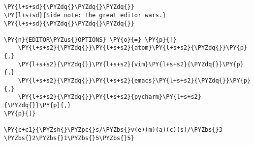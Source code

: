 

\section*{}

\begin{Verbatim}[commandchars=\\\{\}]
\PY{l+s+sd}{\PYZdq{}\PYZdq{}\PYZdq{}}
\PY{l+s+sd}{Side note: The great editor wars.}
\PY{l+s+sd}{\PYZdq{}\PYZdq{}\PYZdq{}}

\PY{n}{EDITOR\PYZus{}OPTIONS} \PY{o}{=} \PY{p}{[}
    \PY{l+s+s2}{\PYZdq{}}\PY{l+s+s2}{atom}\PY{l+s+s2}{\PYZdq{}}\PY{p}{,}
    \PY{l+s+s2}{\PYZdq{}}\PY{l+s+s2}{vim}\PY{l+s+s2}{\PYZdq{}}\PY{p}{,}
    \PY{l+s+s2}{\PYZdq{}}\PY{l+s+s2}{emacs}\PY{l+s+s2}{\PYZdq{}}\PY{p}{,}
    \PY{l+s+s2}{\PYZdq{}}\PY{l+s+s2}{pycharm}\PY{l+s+s2}{\PYZdq{}}\PY{p}{,}
\PY{p}{]}

\PY{c+c1}{\PYZsh{}\PYZpc{}s/\PYZbs{}v(e)(m)(a)(c)(s)/\PYZbs{}3 \PYZbs{}2\PYZbs{}1\PYZbs{}5\PYZbs{}5}
\end{Verbatim}
